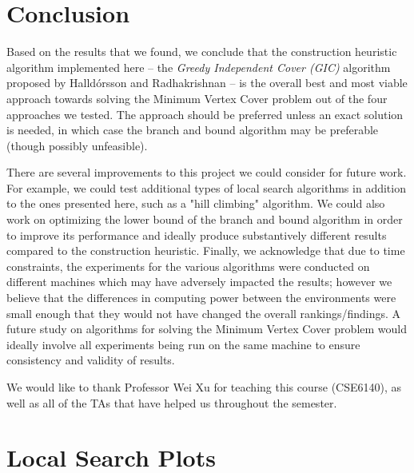 \documentclass[acmlarge]{acmart}
\begin{document}
\section{Conclusion}
Based on the results that we found, we conclude that the construction heuristic algorithm implemented here -- the \textit{Greedy Independent Cover (GIC)} algorithm proposed by Halld\'{o}rsson and Radhakrishnan \cite{Hall97} -- is the overall best and most viable approach towards solving the Minimum Vertex Cover problem out of the four approaches we tested. The approach should be preferred unless an exact solution is needed, in which case the branch and bound algorithm may be preferable (though possibly unfeasible).

There are several improvements to this project we could consider for future work. For example, we could test additional types of local search algorithms in addition to the ones presented here, such as a "hill climbing" algorithm. We could also work on optimizing the lower bound of the branch and bound algorithm in order to improve its performance and ideally produce substantively different results compared to the construction heuristic. Finally, we acknowledge that due to time constraints, the experiments for the various algorithms were conducted on different machines which may have adversely impacted the results; however we believe that the differences in computing power between the environments were small enough that they would not have changed the overall rankings/findings. A future study on algorithms for solving the Minimum Vertex Cover problem would ideally involve all experiments being run on the same machine to ensure consistency and validity of results. 



\begin{acks}
We would like to thank Professor Wei Xu for teaching this course (CSE6140), as well as all of the TAs that have helped us throughout the semester.
\end{acks}




\appendix

\newpage \section{Local Search Plots}\label{sec:local}
\end{document}
